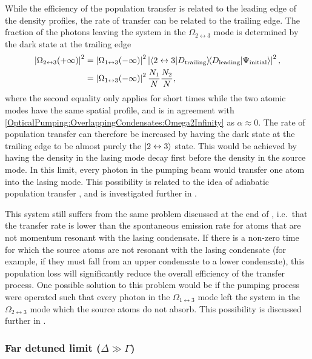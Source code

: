 While the efficiency of the population transfer is related to the leading edge of the density profiles, the rate of transfer can be related to the trailing edge.  The fraction of the photons leaving the system in the $\Omega_{2\leftrightarrow 3}$ mode is determined by the dark state at the trailing edge
\begin{align}
    \left|\Omega_{2\leftrightarrow 3}(+\infty)\right|^2 &= \left|\Omega_{1\leftrightarrow 3}(-\infty)\right|^2 \left|\left<2 \leftrightarrow 3\middle|D_\text{trailing}\right>\!\! \left<D_\text{leading}\middle|\Psi_\text{initial}\right>\right|^2, \\
    &= \left|\Omega_{1\leftrightarrow 3}(-\infty)\right|^2 \frac{N_1}{N} \frac{N_2}{N},
\end{align}
where the second equality only applies for short times while the two atomic modes have the same spatial profile, and is in agreement with \eqref{OpticalPumping:OverlappingCondensates:Omega2Infinity} as $\alpha \approx 0$.  The rate of population transfer can therefore be increased by having the dark state at the trailing edge to be almost purely the ${\left|2 \leftrightarrow 3\right>}$ state.  This would be achieved by having the density in the lasing mode decay first before the density in the source mode.  In this limit, every photon in the pumping beam would transfer one atom into the lasing mode.  This possibility is related to the idea of adiabatic population transfer \citep{Kuklinski:1989}, and is investigated further in .


This system still suffers from the same problem discussed at the end of , i.e.\ that the transfer rate is lower than the spontaneous emission rate for atoms that are not momentum resonant with the lasing condensate.  If there is a non-zero time for which the source atoms are not resonant with the lasing condensate (for example, if they must fall from an upper condensate to a lower condensate), this population loss will significantly reduce the overall efficiency of the transfer process.  One possible solution to this problem would be if the pumping process were operated such that every photon in the $\Omega_{1\leftrightarrow 3}$ mode left the system in the $\Omega_{2\leftrightarrow 3}$ mode which the source atoms do not absorb.  This possibility is discussed further in .

\subsubsection{Far detuned limit ($\Delta \gg \Gamma$)}

